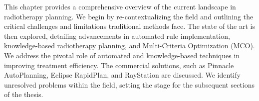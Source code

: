 This chapter provides a comprehensive overview of the current landscape in radiotherapy planning.
We begin by re-contextualizing the field and outlining the critical challenges and limitations traditional methods face.
The state of the art is then explored, detailing advancements in automated rule implementation, knowledge-based radiotherapy planning, and Multi-Criteria Optimization (MCO).
We address the pivotal role of automated and knowledge-based techniques in improving treatment efficiency.
The commercial solutions, such as Pinnacle AutoPlanning, Eclipse RapidPlan, and RayStation are discussed.
We identify unresolved problems within the field, setting the stage for the subsequent sections of the thesis.
